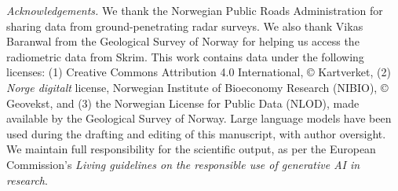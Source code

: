 \documentclass[soil, manuscript]{copernicus}
\begin{document}

\begin{acknowledgements}
\emph{Acknowledgements.} We thank the Norwegian Public Roads Administration for sharing data from ground-penetrating radar surveys. We also thank Vikas Baranwal from the Geological Survey of Norway for helping us access the radiometric data from Skrim. This work contains data under the following licenses: (1) Creative Commons Attribution 4.0 International, © Kartverket, (2) \emph{Norge digitalt} license, Norwegian Institute of Bioeconomy Research (NIBIO), © Geovekst, and (3) the Norwegian License for Public Data (NLOD), made available by the Geological Survey of Norway. Large language models have been used during the drafting and editing of this manuscript, with author oversight. We maintain full responsibility for the scientific output, as per the European Commission's \emph{Living guidelines on the responsible use of generative AI in research}.
\end{acknowledgements}







\end{document}
